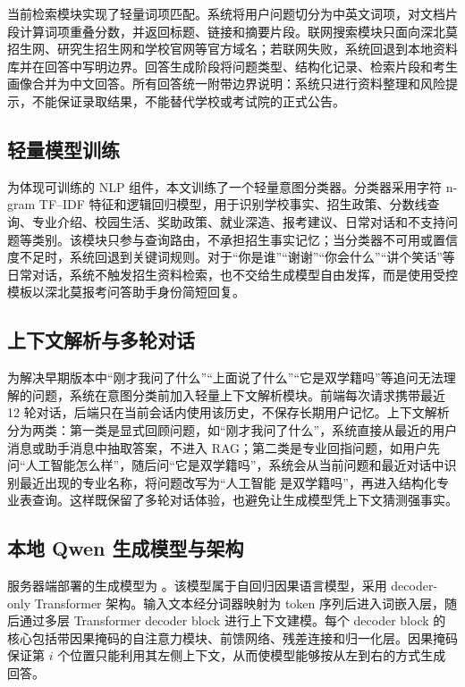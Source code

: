 \documentclass[UTF8,a4paper,11pt]{ctexart}
\begin{document}
当前检索模块实现了轻量词项匹配。系统将用户问题切分为中英文词项，对文档片段计算词项重叠分数，并返回标题、链接和摘要片段。联网搜索模块只面向深北莫招生网、研究生招生网和学校官网等官方域名；若联网失败，系统回退到本地资料库并在回答中写明边界。回答生成阶段将问题类型、结构化记录、检索片段和考生画像合并为中文回答。所有回答统一附带边界说明：系统只进行资料整理和风险提示，不能保证录取结果，不能替代学校或考试院的正式公告。

\subsection{轻量模型训练}

为体现可训练的 NLP 组件，本文训练了一个轻量意图分类器。分类器采用字符 n-gram TF--IDF 特征和逻辑回归模型，用于识别学校事实、招生政策、分数线查询、专业介绍、校园生活、奖助政策、就业深造、报考建议、日常对话和不支持问题等类别。该模块只参与查询路由，不承担招生事实记忆；当分类器不可用或置信度不足时，系统回退到关键词规则。对于“你是谁”“谢谢”“你会什么”“讲个笑话”等日常对话，系统不触发招生资料检索，也不交给生成模型自由发挥，而是使用受控模板以深北莫报考问答助手身份简短回复。

\subsection{上下文解析与多轮对话}

为解决早期版本中“刚才我问了什么”“上面说了什么”“它是双学籍吗”等追问无法理解的问题，系统在意图分类前加入轻量上下文解析模块。前端每次请求携带最近 12 轮对话，后端只在当前会话内使用该历史，不保存长期用户记忆。上下文解析分为两类：第一类是显式回顾问题，如“刚才我问了什么”，系统直接从最近的用户消息或助手消息中抽取答案，不进入 RAG；第二类是专业回指问题，如用户先问“人工智能怎么样”，随后问“它是双学籍吗”，系统会从当前问题和最近对话中识别最近出现的专业名称，将问题改写为“人工智能 是双学籍吗”，再进入结构化专业表查询。这样既保留了多轮对话体验，也避免让生成模型凭上下文猜测强事实。

\subsection{本地 Qwen 生成模型与架构}

服务器端部署的生成模型为 \QwenFineTuneModel。该模型属于自回归因果语言模型，采用 decoder-only Transformer 架构\cite{vaswani2017attention,qwen2024technical,qwen25modelcard}。输入文本经分词器映射为 token 序列后进入词嵌入层，随后通过多层 Transformer decoder block 进行上下文建模。每个 decoder block 的核心包括带因果掩码的自注意力模块、前馈网络、残差连接和归一化层。因果掩码保证第 $i$ 个位置只能利用其左侧上下文，从而使模型能够按从左到右的方式生成回答。
\end{document}
